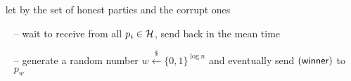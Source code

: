 \begin{minipage}{0.5\textwidth}
\begin{bbox}[title={Functionality $\F_\m{lottery}(\mathcal{P} = p_1,...p_n)$}]
~
let \honest by the set of honest parties and \crupt the corrupt ones 

\begin{itemize}[leftmargin=*]
\item[--] wait to receive  from all $p_i \in \mathcal{H}$, send  back in the mean time
\item[--] generate a random number $w \xleftarrow{\$} \{0,1\}^{\log n}$ and eventually send $({\mathsf {winner}})$ to $p_{w}$
\end{itemize}
\end{bbox}
\end{minipage}
